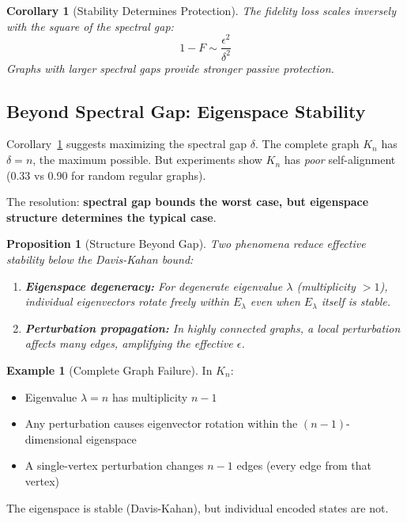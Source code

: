 \documentclass[11pt,a4paper]{article}
\newtheorem{proposition}[theorem]{Proposition}
\newtheorem{corollary}[theorem]{Corollary}
\theoremstyle{definition}
\newtheorem{example}[theorem]{Example}
\begin{document}
\begin{corollary}[Stability Determines Protection]
\label{cor:stability_protection}
The fidelity loss scales inversely with the square of the spectral gap:
\begin{equation}
    1 - F \sim \frac{\epsilon^2}{\delta^2}
\end{equation}
Graphs with larger spectral gaps provide stronger passive protection.
\end{corollary}

\subsection{Beyond Spectral Gap: Eigenspace Stability}

Corollary~\ref{cor:stability_protection} suggests maximizing the spectral gap $\delta$. The complete graph $K_n$ has $\delta = n$, the maximum possible. But experiments show $K_n$ has \emph{poor} self-alignment (0.33 vs 0.90 for random regular graphs).

The resolution: \textbf{spectral gap bounds the worst case, but eigenspace structure determines the typical case}.

\begin{proposition}[Structure Beyond Gap]
\label{prop:structure}
Two phenomena reduce effective stability below the Davis-Kahan bound:
\begin{enumerate}[noitemsep]
    \item \textbf{Eigenspace degeneracy:} For degenerate eigenvalue $\lambda$ (multiplicity $> 1$), individual eigenvectors rotate freely within $E_\lambda$ even when $E_\lambda$ itself is stable.
    \item \textbf{Perturbation propagation:} In highly connected graphs, a local perturbation affects many edges, amplifying the effective $\epsilon$.
\end{enumerate}
\end{proposition}

\begin{example}[Complete Graph Failure]
In $K_n$:
\begin{itemize}[noitemsep]
    \item Eigenvalue $\lambda = n$ has multiplicity $n-1$
    \item Any perturbation causes eigenvector rotation within the $(n-1)$-dimensional eigenspace
    \item A single-vertex perturbation changes $n-1$ edges (every edge from that vertex)
\end{itemize}
The eigenspace is stable (Davis-Kahan), but individual encoded states are not.
\end{example}
\end{document}
